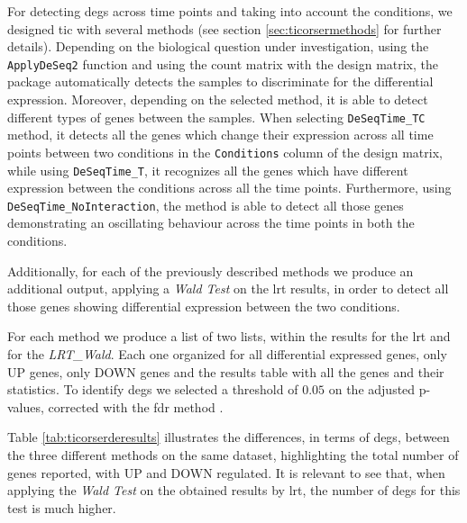 For detecting \glspl{deg} across time points and taking into account the conditions, we designed \gls{tic} with several methods (see section \ref{sec:ticorsermethods} for further details).
Depending on the biological question under investigation, using the \lstinline!ApplyDeSeq2! function and using the count matrix with the design matrix, the package automatically detects the samples to discriminate for the differential expression.
Moreover, depending on the selected method, it is able to detect different types of genes between the samples.
When selecting \lstinline!DeSeqTime_TC! method, it detects all the genes which change their expression across all time points between two conditions in the \lstinline!Conditions! column of the design matrix, while using \lstinline!DeSeqTime_T!, it recognizes all the genes which have different expression between the conditions across all the time points. 
Furthermore, using \lstinline!DeSeqTime_NoInteraction!, the method is able to detect all those genes demonstrating an oscillating behaviour across the time points in both the conditions.

Additionally, for each of the previously described methods we produce an additional output, applying a \textit{Wald Test} on the \gls{lrt} results, in order to detect all those genes showing differential expression between the two conditions.

For each method we produce a list of two lists, within the results for the \gls{lrt} and for the \textit{LRT\_Wald}. Each one organized for all differential expressed genes, only UP genes, only DOWN genes and the results table with all the genes and their statistics.
To identify \glspl{deg} we selected a threshold of $0.05$ on the adjusted p-values, corrected with the \gls{fdr} method \cite{Benjamini1995}.

Table \ref{tab:ticorserderesults} illustrates the differences, in terms of \glspl{deg}, between the three different methods on the same dataset, highlighting the total number of genes reported, with UP and DOWN regulated. 
It is relevant to see that, when applying the \textit{Wald Test} on the obtained results by \gls{lrt}, the number of \glspl{deg} for this test is much higher.


